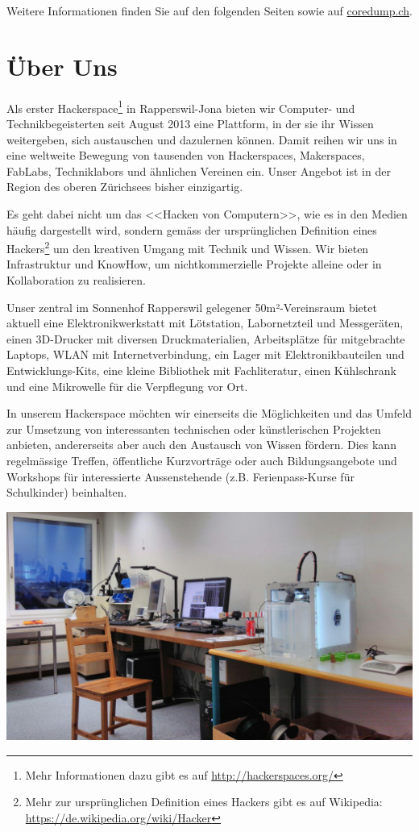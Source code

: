 \documentclass[10pt,a4paper,parskip,fleqn]{scrartcl}
\begin{document}
Weitere Informationen finden Sie auf den folgenden Seiten sowie auf
\url{coredump.ch}.

\newpage

\section{Über Uns}

Als erster Hackerspace\footnote{Mehr Informationen dazu gibt es auf
\url{http://hackerspaces.org/}} in Rapperswil-Jona bieten wir Computer- und
Technikbegeisterten seit August 2013 eine Plattform, in der sie ihr Wissen
weitergeben, sich austauschen und dazulernen können. Damit reihen wir uns in
eine weltweite Bewegung von tausenden von Hackerspaces, Makerspaces, FabLabs,
Techniklabors und ähnlichen Vereinen ein. Unser Angebot ist in der Region des
oberen Zürichsees bisher einzigartig.

Es geht dabei nicht um das <<Hacken von Computern>>, wie es in den Medien häufig
dargestellt wird, sondern gemäss der ursprünglichen Definition eines
Hackers\footnote{Mehr zur ursprünglichen Definition eines Hackers gibt es auf
Wikipedia: \url{https://de.wikipedia.org/wiki/Hacker}} um den kreativen Umgang
mit Technik und Wissen. Wir bieten Infrastruktur und KnowHow, um
nichtkommerzielle Projekte alleine oder in Kollaboration zu realisieren.

Unser zentral im Sonnenhof Rapperswil gelegener 50m²-Vereinsraum bietet aktuell
eine Elektronikwerkstatt mit Lötstation, Labornetzteil und Messgeräten, einen
3D-Drucker mit diversen Druckmaterialien, Arbeitsplätze für mitgebrachte
Laptops, WLAN mit Internetverbindung, ein Lager mit Elektronikbauteilen und
Entwicklungs-Kits, eine kleine Bibliothek mit Fachliteratur, einen Kühlschrank
und eine Mikrowelle für die Verpflegung vor Ort.

In unserem Hackerspace möchten wir einerseits die Möglichkeiten und das Umfeld
zur Umsetzung von interessanten technischen oder künstlerischen Projekten
anbieten, andererseits aber auch den Austausch von Wissen fördern. Dies kann
regelmässige Treffen, öffentliche Kurzvorträge oder auch Bildungsangebote und
Workshops für interessierte Aussenstehende (z.B. Ferienpass-Kurse für
Schulkinder) beinhalten.

\includegraphics[width=\textwidth]{raum.jpg}
\end{document}
